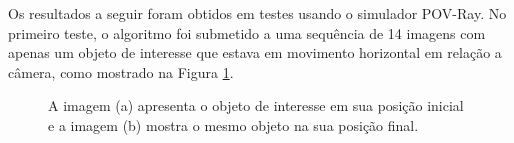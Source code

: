 Os resultados a seguir foram obtidos em testes usando o simulador POV-Ray.
No primeiro teste, o algoritmo foi submetido a uma sequência de 14 imagens 
com apenas um objeto de interesse que estava em movimento horizontal em relação a câmera, 
como mostrado na Figura \ref{fig:imgpapercerta}.
\begin{figure}[H]
\centering
  \caption{A imagem (a) apresenta o objeto de interesse  em sua posição inicial  
   e a imagem (b) mostra o mesmo objeto na sua posição final.}
  \label{fig:imgpapercerta}
\end{figure}

